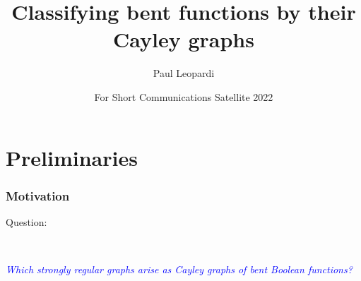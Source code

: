 \documentclass[pdf,sprung,slideColor,nocolorBG]{beamer}
\title{Classifying bent functions by their Cayley graphs}
\author{Paul Leopardi}
\date{For Short Communications Satellite 2022}
\institute{Australian National University (professional staff)
\\
National Computational Infrastructure}
\newenvironment{colortheme}[1]{
\def\ProvidesPackageRCS $##1${\relax}
\renewcommand{\ProcessOptions}{\relax}
\makeatletter

\makeatother
}{}
\newcommand{\Emph}[1]{\emph{\textcolor{blue}{#1}}}
\begin{document}
\frame{\titlepage}

\section{Preliminaries}

\begin{colortheme}{jubata}

\begin{frame}
\frametitle{Motivation}

Question:

~

\Emph{Which strongly regular graphs arise as Cayley graphs of bent Boolean functions?}

\end{frame}
\end{colortheme}
\end{document}
